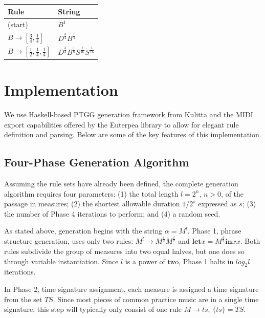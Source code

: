 \documentclass{article}
\begin{document}
\bgroup
\def\arraystretch{1.5}
\begin{center}
\begin{tabular}{ l l }
 Rule & String \\
 \hline
 (start)                                                  & $B^{1}$ \\
 $B \rightarrow [\frac{3}{4}, \frac{1}{4}]$               & $D^{\frac{3}{4}} B^{\frac{1}{4}}$ \\
 $B \rightarrow [\frac{1}{2}, \frac{1}{4}, \frac{1}{4}]$  & $D^{\frac{3}{4}} B^{\frac{1}{8}} S^{\frac{1}{16}} S^{\frac{1}{16}}$ \\
\end{tabular}
\end{center}
\egroup


\section{Implementation}

We use Haskell-based PTGG generation framework from Kulitta and the MIDI export capabilities offered by the Euterpea library \cite{euterpea} to allow for elegant rule definition and parsing. Below are some of the key features of this implementation.

\subsection{Four-Phase Generation Algorithm}

Assuming the rule sets have already been defined, the complete generation algorithm requires four parameters: (1) the total length $l = 2^n$, $n > 0$, of the passage in measures; (2) the shortest allowable duration $1/{2^s}$ expressed as $s$; (3) the number of Phase 4 iterations to perform; and (4) a random seed.

As stated above, generation begins with the string $\alpha = M^l$. Phase 1, phrase structure generation, uses only two rules: $M^l \rightarrow M^\frac{l}{2} M^\frac{l}{2}$ and $\textbf{let} x = M^\frac{d}{2} \textbf{in} x x$. Both rules subdivide the group of measures into two equal halves, but one does so through variable instantiation. Since $l$ is a power of two, Phase 1 halts in $log_2 l$ iterations.

In Phase 2, time signature assignment, each measure is assigned a time signature from the set $TS$. Since most pieces of common practice music are in a single time signature, this step will typically only consist of one rule $M \rightarrow ts$, $\{ ts \} = TS$.
\end{document}
